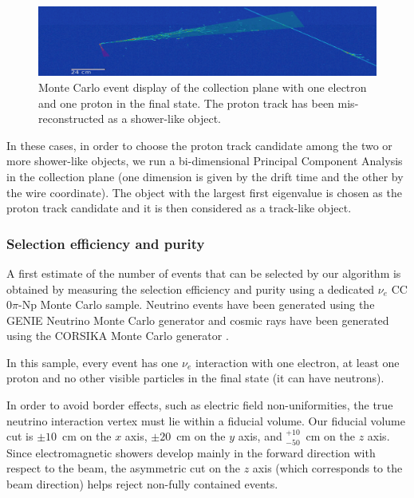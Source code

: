 \begin{figure}[htbp]
	\begin{center}
    	\includegraphics[width=0.8\linewidth]{figures/2showers.png}
    	\caption{Monte Carlo event display of the collection plane with one electron and one proton in the final state. The proton track has been mis-reconstructed as a shower-like object.} \label{fig:2showers}
	\end{center}
\end{figure}

In these cases, in order to choose the proton track candidate among the two or more shower-like objects, we run a bi-dimensional Principal Component Analysis in the collection plane (one dimension is given by the drift time and the other by the wire coordinate). The object with the largest first eigenvalue is chosen as the proton track candidate and it is then considered as a track-like object.

\subsubsection{Selection efficiency and purity}\label{sec:eff}
A first estimate of the number of events that can be selected by our algorithm is obtained by measuring the selection efficiency and purity using a dedicated $\nu_{e}$ CC$0\pi$-Np Monte Carlo sample. Neutrino events have been generated using the GENIE Neutrino Monte Carlo generator \cite{genie} and cosmic rays have been generated using the CORSIKA Monte Carlo generator \cite{corsika}. 

In this sample, every event has one $\nu_{e}$ interaction with one electron, at least one proton and no other visible particles in the final state (it can have neutrons). 

In order to avoid border effects, such as electric field non-uniformities, the true neutrino interaction vertex must lie within a fiducial volume. Our fiducial volume cut is $\pm10$~cm on the $x$ axis, $\pm20$~cm on the $y$ axis, and $^{+10}_{-50}$~cm on the $z$ axis. 
Since electromagnetic showers develop mainly in the forward direction with respect to the beam, the asymmetric cut on the $z$ axis (which corresponds to the beam direction) helps reject non-fully contained events.


